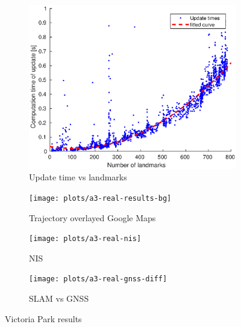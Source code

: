 \begin{figure}
    \centering
    \begin{subfigure}{0.45\textwidth}
        \includegraphics[width=\textwidth]{plots/a3/update-time-vs-landmarks}
        \caption{Update time vs landmarks}
        \label{fig:a3-update_time_landmarks}
    \end{subfigure}
    \begin{subfigure}{0.45\textwidth}
        \texttt{[image: plots/a3-real-results-bg]}
        \caption{Trajectory overlayed Google Maps}
        \label{fig:a3-real-results_bg}
    \end{subfigure}
    \begin{subfigure}{0.45\textwidth}
        \texttt{[image: plots/a3-real-nis]}
        \caption{NIS}
        \label{fig:a3-real-nis}
    \end{subfigure}
    \begin{subfigure}{0.45\textwidth}
        \texttt{[image: plots/a3-real-gnss-diff]}
        \caption{SLAM vs GNSS}
        \label{fig:a3-real-gnss-diff}
    \end{subfigure}

    \caption{Victoria Park results}
\end{figure}
